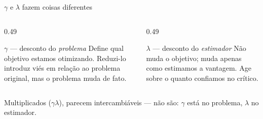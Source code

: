 \documentclass[aspectratio=169, 10pt]{beamer}
\begin{document}
\begin{frame}{$\gamma$ e $\lambda$ fazem coisas diferentes}

  \begin{center}
  \end{center}

  \begin{columns}[T]
  \begin{column}{0.49\textwidth}
    \begin{defbox}{$\gamma$ --- desconto do \emph{problema}}
      Define qual objetivo estamos otimizando. Reduzi-lo introduz viés em relação
      ao problema original, mas o problema muda de fato.
    \end{defbox}
  \end{column}
  \begin{column}{0.49\textwidth}
    \begin{defbox}{$\lambda$ --- desconto do \emph{estimador}}
      Não muda o objetivo; muda apenas como estimamos a vantagem. Age sobre o quanto
      confiamos no crítico.
    \end{defbox}
  \end{column}
  \end{columns}

  \begin{alertabox}
    Multiplicados ($\gamma\lambda$), parecem intercambiáveis --- não são: $\gamma$
    está no problema, $\lambda$ no estimador.
  \end{alertabox}
\end{frame}
\end{document}
